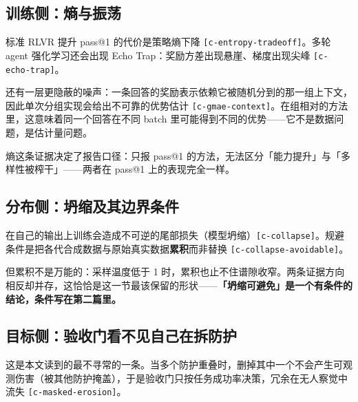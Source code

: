 \subsection{训练侧：熵与振荡}

标准 RLVR 提升 pass@1 的代价是策略熵下降 {\scriptsize\texttt{[c-\hspace{0pt}entropy-\hspace{0pt}tradeoff]}}。多轮 agent 强化学习还会出现 Echo Trap：奖励方差出现悬崖、梯度出现尖峰 {\scriptsize\texttt{[c-\hspace{0pt}echo-\hspace{0pt}trap]}}。


还有一层更隐蔽的噪声：一条回答的奖励表示依赖它被随机分到的那一组上下文，因此单次分组实现会给出不可靠的优势估计 {\scriptsize\texttt{[c-\hspace{0pt}gmae-\hspace{0pt}context]}}。在组相对的方法里，这意味着同一个回答在不同 batch 里可能得到不同的优势——它不是数据问题，是估计量问题。


熵这条证据决定了报告口径：只报 pass@1 的方法，无法区分「能力提升」与「多样性被榨干」——两者在 pass@1 上的表现完全一样。


\subsection{分布侧：坍缩及其边界条件}

在自己的输出上训练会造成不可逆的尾部损失（模型坍缩）{\scriptsize\texttt{[c-\hspace{0pt}collapse]}}。规避条件是把各代合成数据与原始真实数据\textbf{累积}而非替换 {\scriptsize\texttt{[c-\hspace{0pt}collapse-\hspace{0pt}avoidable]}}。


但累积不是万能的：采样温度低于 1 时，累积也止不住谱隙收窄。两条证据方向相反却并存，这恰恰是这一节最该保留的形状——\textbf{「坍缩可避免」是一个有条件的结论，条件写在第二篇里。}


\subsection{目标侧：验收门看不见自己在拆防护}

这是本文读到的最不寻常的一条。当多个防护重叠时，删掉其中一个不会产生可观测伤害（被其他防护掩盖），于是验收门只按任务成功率决策，冗余在无人察觉中流失 {\scriptsize\texttt{[c-\hspace{0pt}masked-\hspace{0pt}erosion]}}。


